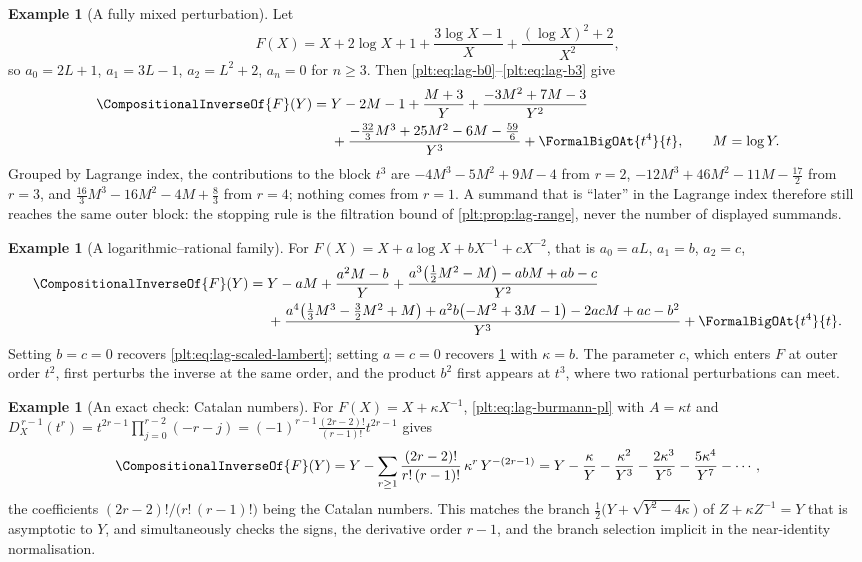 \documentclass[11pt,oneside]{article}
\theoremstyle{plain}
\theoremstyle{definition}
\newtheorem{example}[theorem]{Example}
\theoremstyle{remark}
\newcommand{\DX}{D_{X}}                                  %
\newcommand{\rev}[1]{\CompositionalInverseOf{#1}}
\begin{document}
\begin{example}[A fully mixed perturbation]
\label{plt:ex:lag-mixed}
Let
\[
  F(X)=X+2\log X+1+\frac{3\log X-1}{X}+\frac{(\log X)^2+2}{X^2},
\]
so \(a_0=2L+1\), \(a_1=3L-1\), \(a_2=L^2+2\), \(a_n=0\) for \(n\ge3\).  Then
\cref{plt:eq:lag-b0}--\cref{plt:eq:lag-b3} give
\begin{align}
  \rev{F}(Y)={}&Y-2M-1+\frac{M+3}{Y}
    +\frac{-3M^2+7M-3}{Y^2}\notag\\
   &+\frac{-\tfrac{32}{3}M^3+25M^2-6M-\tfrac{59}{6}}{Y^3}
    +\FormalBigOAt{t^4}{t},
  \qquad M=\log Y.
  \label{plt:eq:lag-mixed-inverse}
\end{align}
Grouped by Lagrange index, the contributions to the block \(t^3\) are
\(-4M^3-5M^2+9M-4\) from \(r=2\), \(-12M^3+46M^2-11M-\tfrac{17}{2}\) from
\(r=3\), and \(\tfrac{16}{3}M^3-16M^2-4M+\tfrac83\) from \(r=4\); nothing comes
from \(r=1\).  A summand that is ``later'' in the Lagrange index therefore
still reaches the same outer block: the stopping rule is the filtration bound
of \cref{plt:prop:lag-range}, never the number of displayed summands.
\end{example}

\begin{example}[A logarithmic--rational family]
\label{plt:ex:lag-abc}
For \(F(X)=X+a\log X+bX^{-1}+cX^{-2}\), that is \(a_0=aL\), \(a_1=b\),
\(a_2=c\),
\begin{align}
  \rev{F}(Y)={}&Y-aM+\frac{a^2M-b}{Y}
   +\frac{a^3\bigl(\tfrac12M^2-M\bigr)-abM+ab-c}{Y^2}\notag\\
   &+\frac{a^4\bigl(\tfrac13M^3-\tfrac32M^2+M\bigr)
        +a^2b\bigl(-M^2+3M-1\bigr)-2acM+ac-b^2}{Y^3}
   +\FormalBigOAt{t^4}{t}.
   \label{plt:eq:lag-abc-inverse}
\end{align}
Setting \(b=c=0\) recovers \cref{plt:eq:lag-scaled-lambert}; setting
\(a=c=0\) recovers \cref{plt:ex:lag-catalan} with \(\kappa=b\).  The parameter
\(c\), which enters \(F\) at outer
order \(t^2\), first perturbs the inverse at the same order, and the product
\(b^2\) first appears at \(t^3\), where two rational perturbations can meet.
\end{example}

\begin{example}[An exact check: Catalan numbers]
\label{plt:ex:lag-catalan}
For \(F(X)=X+\kappa X^{-1}\), \cref{plt:eq:lag-burmann-pl} with \(A=\kappa t\)
and
\(\DX^{\,r-1}(t^r)=t^{2r-1}\prod_{j=0}^{r-2}(-r-j)
=(-1)^{r-1}\frac{(2r-2)!}{(r-1)!}t^{2r-1}\) gives
\[
  \rev{F}(Y)=Y-\sum_{r\ge1}\frac{(2r-2)!}{r!\,(r-1)!}\,\kappa^r\,Y^{-(2r-1)}
  =Y-\frac \kappa Y-\frac{\kappa^2}{Y^3}-\frac{2\kappa^3}{Y^5}
   -\frac{5\kappa^4}{Y^7}-\cdots,
\]
the coefficients \((2r-2)!/\bigl(r!\,(r-1)!\bigr)\) being the Catalan numbers.
This matches the branch \(\tfrac12\bigl(Y+\sqrt{Y^2-4\kappa}\bigr)\) of
\(Z+\kappa Z^{-1}=Y\) that is asymptotic to \(Y\), and simultaneously checks
the signs, the derivative order \(r-1\), and the branch selection implicit in
the near-identity normalisation.
\end{example}
\end{document}
